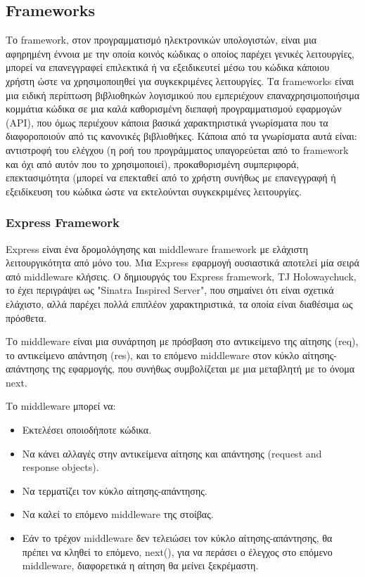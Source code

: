 	\subsection{Frameworks}
	
		Το framework, στον προγραμματισμό ηλεκτρονικών υπολογιστών, είναι μια αφηρημένη έννοια με την οποία κοινός κώδικας ο οποίος παρέχει γενικές λειτουργίες, μπορεί να επανεγγραφεί επιλεκτικά ή να εξειδικευτεί μέσω του κώδικα κάποιου χρήστη ώστε να χρησιμοποιηθεί για συγκεκριμένες λειτουργίες. Τα frameworks είναι μια ειδική περίπτωση βιβλιοθηκών λογισμικού που εμπεριέχουν επαναχρησιμοποιήσιμα κομμάτια κώδικα σε μια καλά καθορισμένη διεπαφή προγραμματισμού εφαρμογών (API), που όμως περιέχουν κάποια βασικά χαρακτηριστικά γνωρίσματα που τα διαφοροποιούν από τις κανονικές βιβλιοθήκες. Κάποια από τα γνωρίσματα αυτά είναι: αντιστροφή του ελέγχου (η ροή του προγράμματος υπαγορεύεται από το framework και όχι από αυτόν που το χρησιμοποιεί), προκαθορισμένη συμπεριφορά, επεκτασιμότητα (μπορεί να επεκταθεί από το χρήστη συνήθως με επανεγγραφή  ή εξειδίκευση του κώδικα ώστε να εκτελούνται συγκεκριμένες λειτουργίες. \cite{Framework}

	
		\subsubsection{Express Framework}


		Express είναι ένα δρομολόγησης και middleware framework με ελάχιστη λειτουργικότητα από μόνο του. Μια Express εφαρμογή ουσιαστικά αποτελεί μία σειρά από middleware κλήσεις. Ο δημιουργός του Express framework, TJ Holowaychuck, το έχει περιγράψει ως "Sinatra Inspired Server",  που σημαίνει ότι είναι σχετικά ελάχιστο, αλλά παρέχει πολλά επιπλέον χαρακτηριστικά, τα οποία είναι διαθέσιμα ως πρόσθετα. 
		
Το middleware είναι μια συνάρτηση με πρόσβαση στο αντικείμενο της αίτησης (req), το αντικείμενο απάντηση (res), και το επόμενο middleware στον κύκλο αίτησης-απάντησης της εφαρμογής, που συνήθως συμβολίζεται με μια μεταβλητή με το όνομα next.

Το middleware μπορεί να:

\begin{itemize}

\item Εκτελέσει οποιοδήποτε κώδικα.
\item Να κάνει αλλαγές στην αντικείμενα αίτησης και απάντησης (request and response objects).
\item Να τερματίζει τον κύκλο αίτησης-απάντησης.
\item Να καλεί το επόμενο middleware της στοίβας.
\item Εάν το τρέχον middleware δεν τελειώσει τον κύκλο αίτησης-απάντησης, θα πρέπει να κληθεί το επόμενο, next(), για να περάσει ο έλεγχος στο επόμενο middleware, διαφορετικά η αίτηση θα μείνει ξεκρέμαστη.

\end{itemize}


